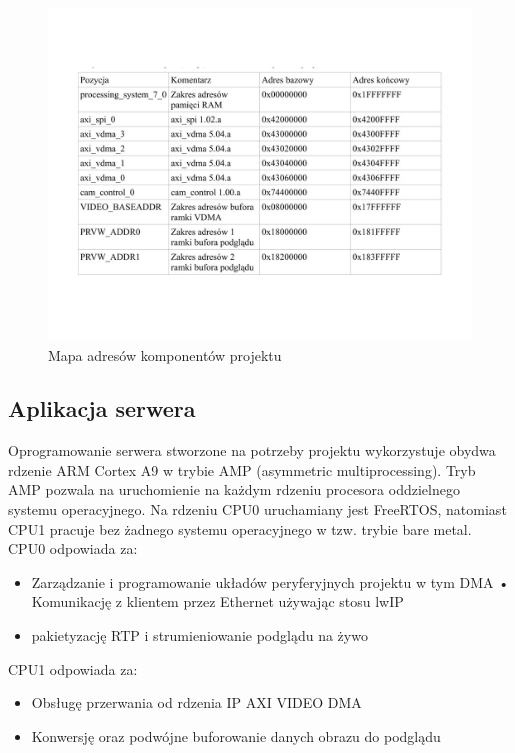 \documentclass[a4paper,11pt,oneside]{book}  %
\begin{document}
\begin{figure}[H]
	\centering
	\includegraphics[width=16cm]{data8.png}
	\caption{Mapa adresów komponentów projektu}
	\label{fig:Zynq8}
\end{figure}

\subsection{Aplikacja serwera}

Oprogramowanie serwera stworzone na potrzeby projektu wykorzystuje obydwa rdzenie ARM Cortex A9 w trybie AMP (asymmetric multiprocessing). Tryb AMP pozwala na uruchomienie na każdym rdzeniu procesora oddzielnego systemu operacyjnego. Na rdzeniu CPU0 uruchamiany jest FreeRTOS, natomiast CPU1 pracuje bez żadnego systemu operacyjnego w tzw. trybie bare metal.
CPU0 odpowiada za:
\begin{itemize} 
\item Zarządzanie i programowanie układów peryferyjnych projektu w tym DMA • Komunikację z klientem przez Ethernet używając stosu lwIP 
\item pakietyzację RTP i strumieniowanie podglądu na żywo
\end{itemize}
CPU1 odpowiada za: 
\begin{itemize}
\item Obsługę przerwania od rdzenia IP AXI VIDEO DMA  
\item Konwersję oraz podwójne buforowanie danych obrazu do podglądu
\end{itemize}
\end{document}
